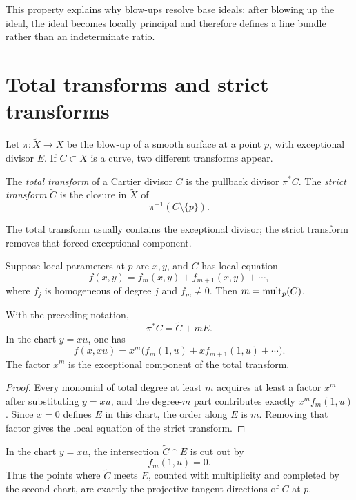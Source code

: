This property explains why blow-ups resolve base ideals: after blowing up the ideal, the ideal becomes locally principal and therefore defines a line bundle rather than an indeterminate ratio.

\section{Total transforms and strict transforms}

Let \(\pi:\widetilde X\to X\) be the blow-up of a smooth surface at a point \(p\), with exceptional divisor \(E\).  If \(C\subset X\) is a curve, two different transforms appear.

\begin{definition}\label{def:vi45-transforms}
The \emph{total transform} of a Cartier divisor \(C\) is the pullback divisor \(\pi^*C\).  The \emph{strict transform} \(\widetilde C\) is the closure in \(\widetilde X\) of
\[
  \pi^{-1}(C\setminus\{p\}).
\]
\end{definition}

The total transform usually contains the exceptional divisor; the strict transform removes that forced exceptional component.

Suppose local parameters at \(p\) are \(x,y\), and \(C\) has local equation
\[
  f(x,y)=f_m(x,y)+f_{m+1}(x,y)+\cdots,
\]
where \(f_j\) is homogeneous of degree \(j\) and \(f_m\neq0\).  Then \(m=\operatorname{mult}_p(C)\).

\begin{proposition}\label{prop:vi45-total-transform-formula}
With the preceding notation,
\[
  \boxed{\pi^*C=\widetilde C+mE.}
\]
In the chart \(y=xu\), one has
\[
  f(x,xu)=x^m\bigl(f_m(1,u)+x f_{m+1}(1,u)+\cdots\bigr).
\]
The factor \(x^m\) is the exceptional component of the total transform.
\end{proposition}

\begin{proof}
Every monomial of total degree at least \(m\) acquires at least a factor \(x^m\) after substituting \(y=xu\), and the degree-\(m\) part contributes exactly \(x^m f_m(1,u)\).  Since \(x=0\) defines \(E\) in this chart, the order along \(E\) is \(m\).  Removing that factor gives the local equation of the strict transform.
\end{proof}

\begin{proposition}\label{prop:vi45-tangent-cone}
In the chart \(y=xu\), the intersection \(\widetilde C\cap E\) is cut out by
\[
  f_m(1,u)=0.
\]
Thus the points where \(\widetilde C\) meets \(E\), counted with multiplicity and completed by the second chart, are exactly the projective tangent directions of \(C\) at \(p\).
\end{proposition}

